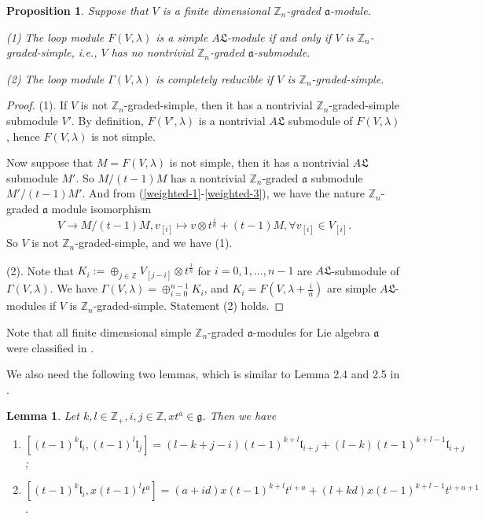 \documentclass[1p]{elsarticle}
\numberwithin{equation}{section}
\def\fg{\mathfrak{g}}
\def\fL{\mathfrak{L}}
\def\ca{\mathfrak{a}}
\def\bZ{\mathbb{Z}}
\def\fl{\mathfrak{l}}
\newtheorem{lemm}[theo]{Lemma}
\newtheorem{prop}[theo]{Proposition}
\begin{document}
\begin{prop}\label{prop12} Suppose that $V$ is a finite dimensional $\bZ_n$-graded $\ca$-module.  

 (1) The loop module $F(V,\lambda)$ is a simple $A\fL$-module if and only if $V$ is $\bZ_n$-graded-simple, i.e., $V$ has no nontrivial $\bZ_n$-graded $\ca$-submodule.

 (2) The loop module  $\Gamma(V,\lambda)$ is completely reducible if $V$ is $\bZ_n$-graded-simple.\end{prop}

\begin{proof} (1). If $V$ is not $\bZ_n$-graded-simple, then it has a nontrivial $\bZ_n$-graded-simple submodule $V'$. By definition, $F(V',\lambda)$ is a nontrivial $A\fL$ submodule of $F(V,\lambda)$, hence $F(V,\lambda)$ is not simple.  
	
	Now suppose that $M=F(V,\lambda)$ is not simple, then it has a nontrivial $A\fL$ submodule $M'$.  So  $M/(t-1)M$ has a nontrivial $\bZ_n$-graded $\ca$ submodule $M'/(t-1)M'$.  And from (\ref{weighted-1}-\ref{weighted-3}), we have the nature $\bZ_n$-graded $\ca$ module isomorphism $$V\rightarrow M/(t-1)M, v_{[i]}\mapsto v\otimes t^{\frac in}+(t-1)M,\forall v_{[i]}\in V_{[i]}.$$ So $V$ is not $\bZ_n$-graded-simple, and we have (1).

(2). Note that $K_i:=\oplus_{j\in \bZ} V_{[j-i]}\otimes t^{\frac jn}$ for $i=0,1,\ldots,n-1$ are $A\fL$-submodule of $\Gamma(V,\lambda)$. We have $\Gamma(V,\lambda)=\oplus_{i=0}^{n-1} K_i$, and $K_i=F(V,\lambda+\frac in)$ are simple $A\fL$-modules if $V$ is $\bZ_n$-graded-simple. Statement (2) holds.
\end{proof}

Note that all finite dimensional simple $\bZ_n$-graded $\ca$-modules for Lie algebra $\ca$ were classified in \cite{MZ}.

We also need the following two lemmas, which is similar to Lemma 2.4 and 2.5 in \cite{CLW}.

\begin{lemm}\label{rel-subalg}
Let $k,l\in\bZ_+,i,j\in \bZ, xt^a\in \fg$. Then we have
\begin{enumerate}
\item $[(t-1)^k\fl_i,(t-1)^l \fl_j]=(l-k+j-i)(t-1)^{k+l}\fl_{i+j}+(l-k)(t-1)^{k+l-1}\fl_{i+j}$;
\item $[(t-1)^k\fl_i,x(t-1)^lt^a]=(a+id)x(t-1)^{k+l}t^{i+a}+(l+kd)x(t-1)^{k+l-1}t^{i+a+1}$.
\end{enumerate}
\end{lemm}
\end{document}
